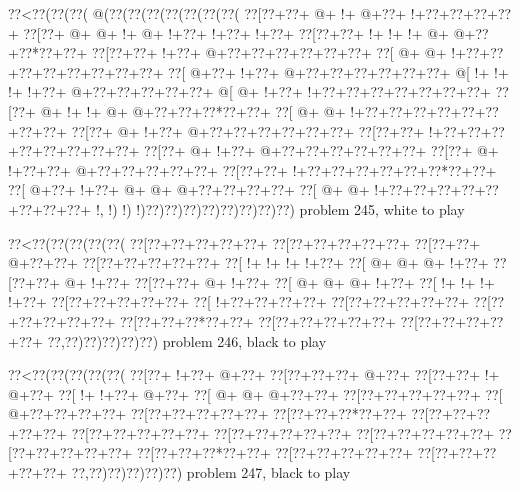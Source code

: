 \vbox{\vbox{\goo
\0??<\0??(\0??(\0??(\- @(\0??(\0??(\0??(\0??(\0??(\0??(\0??(
\0??[\0??+\0??+\- @+\- !+\- @+\0??+\- !+\0??+\0??+\0??+\0??+
\0??[\0??+\- @+\- @+\- !+\- @+\- !+\0??+\- !+\0??+\- !+\0??+
\0??[\0??+\0??+\- !+\- !+\- !+\- @+\- @+\0??+\0??*\0??+\0??+
\0??[\0??+\0??+\- !+\0??+\- @+\0??+\0??+\0??+\0??+\0??+\0??+
\0??[\- @+\- @+\- !+\0??+\0??+\0??+\0??+\0??+\0??+\0??+\0??+
\0??[\- @+\0??+\- !+\0??+\- @+\0??+\0??+\0??+\0??+\0??+\0??+
\- @[\- !+\- !+\- !+\- !+\0??+\- @+\0??+\0??+\0??+\0??+\0??+
\- @[\- @+\- !+\0??+\- !+\0??+\0??+\0??+\0??+\0??+\0??+\0??+
\0??[\0??+\- @+\- !+\- !+\- @+\- @+\0??+\0??+\0??*\0??+\0??+
\0??[\- @+\- @+\- !+\0??+\0??+\0??+\0??+\0??+\0??+\0??+\0??+
\0??[\0??+\- @+\- !+\0??+\- @+\0??+\0??+\0??+\0??+\0??+\0??+
\0??[\0??+\0??+\- !+\0??+\0??+\0??+\0??+\0??+\0??+\0??+\0??+
\0??[\0??+\- @+\- !+\0??+\- @+\0??+\0??+\0??+\0??+\0??+\0??+
\0??[\0??+\- @+\- !+\0??+\0??+\- @+\0??+\0??+\0??+\0??+\0??+
\0??[\0??+\0??+\- !+\0??+\0??+\0??+\0??+\0??+\0??*\0??+\0??+
\0??[\- @+\0??+\- !+\0??+\- @+\- @+\- @+\0??+\0??+\0??+\0??+
\0??[\- @+\- @+\- !+\0??+\0??+\0??+\0??+\0??+\0??+\0??+\0??+
\- !,\- !)\- !)\- !)\0??)\0??)\0??)\0??)\0??)\0??)\0??)\0??)
}
\hfil problem 245, white to play\hfil\break
}

\vbox{\vbox{\goo
\0??<\0??(\0??(\0??(\0??(\0??(
\0??[\0??+\0??+\0??+\0??+\0??+
\0??[\0??+\0??+\0??+\0??+\0??+
\0??[\0??+\0??+\- @+\0??+\0??+
\0??[\0??+\0??+\0??+\0??+\0??+
\0??[\- !+\- !+\- !+\- !+\0??+
\0??[\- @+\- @+\- @+\- !+\0??+
\0??[\0??+\0??+\- @+\- !+\0??+
\0??[\0??+\0??+\- @+\- !+\0??+
\0??[\- @+\- @+\- @+\- !+\0??+
\0??[\- !+\- !+\- !+\- !+\0??+
\0??[\0??+\0??+\0??+\0??+\0??+
\0??[\- !+\0??+\0??+\0??+\0??+
\0??[\0??+\0??+\0??+\0??+\0??+
\0??[\0??+\0??+\0??+\0??+\0??+
\0??[\0??+\0??+\0??*\0??+\0??+
\0??[\0??+\0??+\0??+\0??+\0??+
\0??[\0??+\0??+\0??+\0??+\0??+
\0??,\0??)\0??)\0??)\0??)\0??)
}
\hfil problem 246, black to play\hfil\break
}

\vbox{\vbox{\goo
\0??<\0??(\0??(\0??(\0??(\0??(
\0??[\0??+\- !+\0??+\- @+\0??+
\0??[\0??+\0??+\0??+\- @+\0??+
\0??[\0??+\0??+\- !+\- @+\0??+
\0??[\- !+\- !+\0??+\- @+\0??+
\0??[\- @+\- @+\- @+\0??+\0??+
\0??[\0??+\0??+\0??+\0??+\0??+
\0??[\- @+\0??+\0??+\0??+\0??+
\0??[\0??+\0??+\0??+\0??+\0??+
\0??[\0??+\0??+\0??*\0??+\0??+
\0??[\0??+\0??+\0??+\0??+\0??+
\0??[\0??+\0??+\0??+\0??+\0??+
\0??[\0??+\0??+\0??+\0??+\0??+
\0??[\0??+\0??+\0??+\0??+\0??+
\0??[\0??+\0??+\0??+\0??+\0??+
\0??[\0??+\0??+\0??*\0??+\0??+
\0??[\0??+\0??+\0??+\0??+\0??+
\0??[\0??+\0??+\0??+\0??+\0??+
\0??,\0??)\0??)\0??)\0??)\0??)
}
\hfil problem 247, black to play\hfil\break
}

